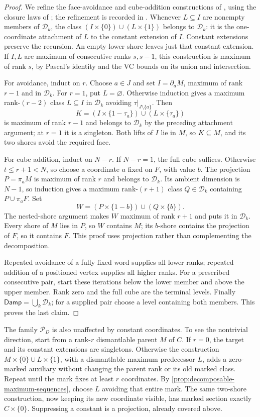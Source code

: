 \documentclass[11pt]{article}
\theoremstyle{definition}
\newcommand{\Damp}{\mathsf{Damp}}
\begin{document}
\begin{proof}
We refine the face-avoidance and cube-addition constructions of
\cite{MaxParents}, using the closure laws of \cite{RecursiveClosure};
the refinement is recorded in \cite{NeighborClasses}.
Whenever $L\subseteq I$ are nonempty members of $\mathcal D_k$, the
class $(I\times\{0\})\cup(L\times\{1\})$ belongs to $\mathcal D_k$:
it is the one-coordinate attachment of $L$ to the constant extension
of $I$. Constant extensions preserve the recursion. An empty lower shore
leaves just that constant extension. If $I,L$ are maximum of consecutive
ranks $s,s-1$, this construction is maximum of rank $s$, by Pascal's
identity and the VC bounds on its union and intersection.

For avoidance, induct on $r$. Choose $a\in J$ and set
$I=\partial_a M$, maximum of rank $r-1$ and in $\mathcal D_k$.
For $r=1$, put $L=\varnothing$. Otherwise induction gives a maximum
rank-$(r-2)$ class $L\subseteq I$ in $\mathcal D_k$ avoiding
$\tau|_{J\setminus\{a\}}$. Then
\[
 K=(I\times\{1-\tau_a\})\cup(L\times\{\tau_a\})
\]
is maximum of rank $r-1$ and belongs to $\mathcal D_k$ by the preceding
attachment argument; at $r=1$ it is a singleton. Both lifts of $I$ lie
in $M$, so $K\subseteq M$, and its two shores avoid the required face.

For cube addition, induct on $N-r$. If $N-r=1$, the full cube suffices.
Otherwise $t\le r+1<N$, so choose a coordinate $a$ fixed on $F$, with
value $b$. The projection $P=\pi_a M$ is maximum of rank $r$ and
belongs to $\mathcal D_k$. Its ambient dimension is $N-1$, so induction
gives a maximum rank-$(r+1)$ class $Q\in\mathcal D_k$ containing
$P\cup\pi_a F$. Set
\[
 W=(P\times\{1-b\})\cup(Q\times\{b\}).
\]
The nested-shore argument makes $W$ maximum of rank $r+1$ and puts it
in $\mathcal D_k$. Every shore of $M$ lies in $P$, so $W$ contains
$M$; its $b$-shore contains the projection of $F$, so it contains $F$.
This proof uses projection rather than complementing the decomposition.

Repeated avoidance of a fully fixed word supplies all lower ranks;
repeated addition of a positioned vertex supplies all higher ranks.
For a prescribed consecutive pair, start these iterations below the lower
member and above the upper member. Rank zero and the full cube are the
terminal levels. Finally $\Damp=\bigcup_k\mathcal D_k$; for a supplied
pair choose a level containing both members. This proves the last claim.
\end{proof}

The family $\mathcal P_D$ is also unaffected by constant coordinates.
To see the nontrivial direction, start from a rank-$r$ dismantlable parent
$M$ of $C$. If $r=0$, the target and its constant extensions are singletons.
Otherwise the construction $M\times\{0\}\cup L\times\{1\}$, with
a dismantlable maximum predecessor $L$, adds a zero-marked auxiliary
without changing the parent rank or its old marked class. Repeat until
the mark fixes at least $r$ coordinates. By
\cref{prop:decomposable-maximum-sequences}, choose $L$ avoiding that
entire mark. The same two-shore construction, now keeping its new
coordinate visible, has marked section exactly $C\times\{0\}$.
Suppressing a constant is a projection, already covered above.
\end{document}
